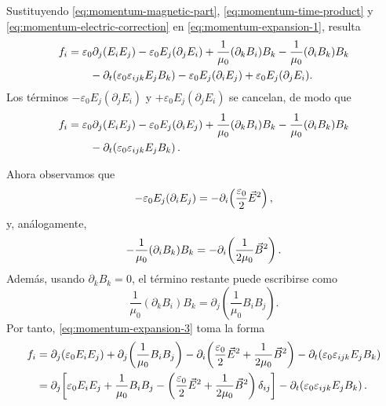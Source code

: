\documentclass[../main.tex]{subfiles}
\begin{document}
Sustituyendo \eqref{eq:momentum-magnetic-part}, \eqref{eq:momentum-time-product} y \eqref{eq:momentum-electric-correction} en \eqref{eq:momentum-expansion-1}, resulta
\begin{align}
    f_i
    &=
    \varepsilon_0\partial_j(E_iE_j)
    -\varepsilon_0E_j(\partial_jE_i)
    +\frac{1}{\mu_0}(\partial_kB_i)B_k
    -\frac{1}{\mu_0}(\partial_iB_k)B_k \notag\\
    &\qquad
    -\partial_t\!\left(\varepsilon_0\varepsilon_{ijk}E_jB_k\right)
    -\varepsilon_0E_j(\partial_iE_j)
    +\varepsilon_0E_j(\partial_jE_i).
    \label{eq:momentum-expansion-2}
\end{align}
Los términos $-\varepsilon_0E_j(\partial_jE_i)$ y $+\varepsilon_0E_j(\partial_jE_i)$ se cancelan, de modo que
\begin{align}
    f_i
    &=
    \varepsilon_0\partial_j(E_iE_j)
    -\varepsilon_0E_j(\partial_iE_j)
    +\frac{1}{\mu_0}(\partial_kB_i)B_k
    -\frac{1}{\mu_0}(\partial_iB_k)B_k \notag\\
    &\qquad
    -\partial_t\!\left(\varepsilon_0\varepsilon_{ijk}E_jB_k\right).
    \label{eq:momentum-expansion-3}
\end{align}

Ahora observamos que
\begin{equation}
    -\varepsilon_0E_j(\partial_iE_j)
    =
    -\partial_i\!\left(\frac{\varepsilon_0}{2}\vec{E}^2\right),
    \label{eq:momentum-electric-gradient}
\end{equation}
y, análogamente,
\begin{equation}
    -\frac{1}{\mu_0}(\partial_iB_k)B_k
    =
    -\partial_i\!\left(\frac{1}{2\mu_0}\vec{B}^2\right).
    \label{eq:momentum-magnetic-gradient}
\end{equation}
Además, usando \(\partial_kB_k=0\), el término restante puede escribirse como
\begin{equation}
    \frac{1}{\mu_0}(\partial_kB_i)B_k
    =
    \partial_j\!\left(\frac{1}{\mu_0}B_iB_j\right).
    \label{eq:momentum-magnetic-divergence}
\end{equation}
Por tanto, \eqref{eq:momentum-expansion-3} toma la forma
\begin{align}
    f_i
    &=
    \partial_j\!\left(\varepsilon_0E_iE_j\right)
    +
    \partial_j\!\left(\frac{1}{\mu_0}B_iB_j\right)
    -
    \partial_i\!\left(
        \frac{\varepsilon_0}{2}\vec{E}^2
        +
        \frac{1}{2\mu_0}\vec{B}^2
    \right)
    -
    \partial_t\!\left(\varepsilon_0\varepsilon_{ijk}E_jB_k\right)
    \notag\\
    &=
    \partial_j\!\left[
        \varepsilon_0E_iE_j
        +
        \frac{1}{\mu_0}B_iB_j
        -
        \left(
            \frac{\varepsilon_0}{2}\vec{E}^2
            +
            \frac{1}{2\mu_0}\vec{B}^2
        \right)\delta_{ij}
    \right]
    -
    \partial_t\!\left(\varepsilon_0\varepsilon_{ijk}E_jB_k\right).
    \label{eq:momentum-balance-precompact}
\end{align}
\end{document}
